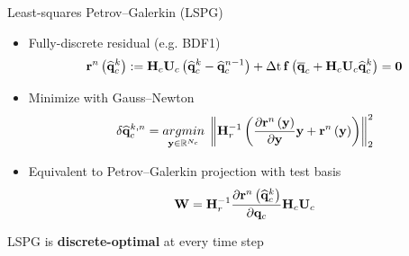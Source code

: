 \documentclass[]{beamer}
\begin{document}
\begin{frame}{Least-squares Petrov--Galerkin (LSPG)}
    \begin{itemize}
		\item Fully-discrete residual (e.g. BDF1)
		\begin{equation*}
			\resFuncIter{\timeIdx}{\consVecCoef^{\newtonIdx}} \defEq \consScale \consTrial \left( \consVecCoef^{\newtonIdx} - \consVecCoef^{\timeIdx-1} \right) + \dt \, \rhsFunc{\consVecCent + \consScale \consTrial \consVecCoef^{\newtonIdx}} = \zeroVec
		\end{equation*}
		\item Minimize with Gauss--Newton
		\begin{equation*}
			\delta \consVecCoef^{\newtonIdx, \timeIdx} = \argmin{\dummyVec \in \mathbb{R}^{\numConsModes}} \norm{\resScaleInv \left(\pde{\resFuncIter{\timeIdx}{\dummyVec}}{\dummyVec} \dummyVec + \resFuncIter{\timeIdx}{\dummyVec}\right)}_2^2
		\end{equation*}
		\item Equivalent to Petrov--Galerkin projection with test basis\footnotemark[2]
		\begin{equation*}
			\testBasis = \resScaleInv \pde{\resFuncIter{\timeIdx}{\consVecCoef^{\newtonIdx}}}{\consVec} \consScale \consTrial
		\end{equation*}
	\end{itemize}
	\vspace{-1em}
	\begin{tcolorbox}[colframe=blue!50!white,halign=center]
		LSPG is \textbf{discrete-optimal} at every time step
	\end{tcolorbox}
\end{frame}
\end{document}
